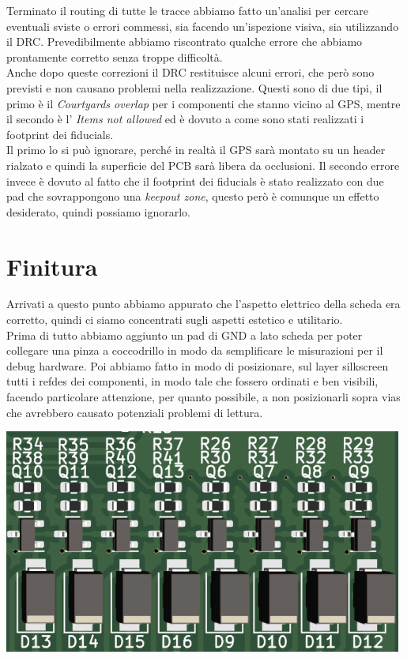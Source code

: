 \noindent Terminato il routing di tutte le tracce abbiamo fatto un'analisi per
cercare eventuali sviste o errori commessi, sia facendo un'ispezione
visiva, sia utilizzando il DRC. Prevedibilmente abbiamo riscontrato
qualche errore che abbiamo prontamente corretto senza troppe difficoltà.\\
Anche dopo queste correzioni il DRC restituisce alcuni errori, che però
sono previsti e non causano problemi nella realizzazione. Questi sono di
due tipi, il primo è il \emph{Courtyards overlap} per i componenti che
stanno vicino al GPS, mentre il secondo è l' \emph{Items not allowed} ed
è dovuto a come sono stati realizzati i footprint dei fiducials.\\
Il primo lo si può ignorare, perché in realtà il GPS sarà montato su un
header rialzato e quindi la superficie del PCB sarà libera da
occlusioni. Il secondo errore invece è dovuto al fatto che il footprint
dei fiducials è stato realizzato con due pad che sovrappongono una
\emph{keepout zone}, questo però è comunque un effetto desiderato,
quindi possiamo ignorarlo.

\hypertarget{finitura}{%
\section{Finitura}\label{finitura}}

\noindent Arrivati a questo punto abbiamo appurato che l'aspetto elettrico della
scheda era corretto, quindi ci siamo concentrati sugli aspetti estetico
e utilitario.\\
Prima di tutto abbiamo aggiunto un pad di GND a lato scheda per poter
collegare una pinza a coccodrillo in modo da semplificare le misurazioni
per il debug hardware. Poi abbiamo fatto in modo di posizionare, sul
layer silkscreen tutti i refdes dei componenti, in modo tale che fossero
ordinati e ben visibili, facendo particolare attenzione, per quanto
possibile, a non posizionarli sopra vias che avrebbero causato
potenziali problemi di lettura.

\begin{center}
\includegraphics[scale=1]{figures/image100.png}
\captionsetup{type=figure}
\end{center}

